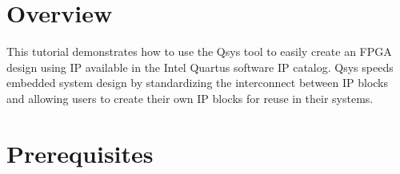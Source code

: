 \tableofcontents

\section*{Overview}

\begin{flushleft}
\noindent
This tutorial demonstrates how to use the Qsys tool to easily create an FPGA design using IP available in the Intel\textsuperscript{\textregistered} Quartus\textsuperscript{\textregistered} software IP catalog.  Qsys speeds embedded system design by standardizing the interconnect between IP blocks and allowing users to create their own IP blocks for reuse in their systems.

\end{flushleft}

\section*{Prerequisites}

